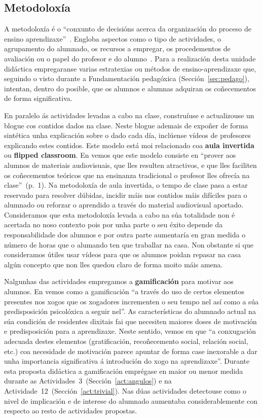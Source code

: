 \subsection{Metodoloxía}

A metodoloxía é o ``conxunto de decisións acerca da organización do proceso de ensino aprendizaxe''~\cite[p.~18]{orientacionesgobvasco}. Engloba aspectos como o tipo de actividades, o agrupamento do alumnado, os recursos a empregar, os procedementos de avaliación ou o papel do profesor e do alumno~\cite{orientacionesgobvasco}. Para a realización desta unidade didáctica empregaranse varias estratexias ou métodos de ensino-aprendizaxe que, seguindo o visto durante a Fundamentación pedagóxica (Sección~\ref{sec:pedago}), intentan, dentro do posible, que os alumnos e alumnas adquiran os coñecementos de forma significativa.

En paralelo ás actividades levadas a cabo na clase, construíuse e actualizouse un blogue cos contidos dados na clase. Neste blogue ademais de expoñer de forma sintética unha explicación sobre o dado cada día, inclúense vídeos de profesores explicando estes contidos. Este modelo está moi relacionado coa \textbf{aula invertida} ou \textbf{flipped classroom}. En  vemos que este modelo consiste en ``prover aos alumnos de materiais audiovisuais, que lles resulten atractivos, e que lles faciliten os coñecementos teóricos que na ensinanza tradicional o profesor lles ofrecía na clase''~(p.~1). Na metodoloxía de aula invertida, o tempo de clase pasa a estar reservado para resolver dúbidas, incidir máis nos contidos máis difíciles para o alumnado ou reforzar o aprendido a través do material audiovisual aportado. Consideramos que esta metodoloxía levada a cabo na súa totalidade non é acertada no noso contexto pois por unha parte o seu éxito depende da responsabilidade dos alumnos e por outra parte aumentaría en gran medida o número de horas que o alumando ten que traballar na casa. Non obstante si que consideramos útiles usar vídeos para que os alumnos poidan repasar na casa algún concepto que non lles quedou claro de forma moito máis amena.

Nalgunhas das actividades empregamos a \textbf{gamificación} para motivar aos alumnos. En  vemos como a gamificación ``a través do uso de certos elementos presentes nos xogos que os xogadores incrementen o seu tempo nel así como a súa predisposición psicolóxica a seguir nel''. As características do alumnado actual na súa condición de residentes dixitais \cite{residentesdigitales} fai que necesiten maiores doses de motivación e predisposición para a aprendizaxe. Neste sentido, vemos en  que ``a conxugación adecuada destes elementos (gratificación, recoñecemento social, relación social, etc.) coa necesidade de motivación parece apuntar de forma case inexorable a dar unha importancia significativa á introdución do xogo na aprendizaxe''. Durante esta proposta didáctica a gamificación emprégase en maior ou menor medida durante as Actividades~3~(Sección~\ref{act:angulos}) e na Actividade~12~(Sección~\ref{act:trivial}). Nas dúas actividades detectouse como o nivel de implicación e de interese do alumnado aumentaba considerablemente con respecto ao resto de actividades propostas.

